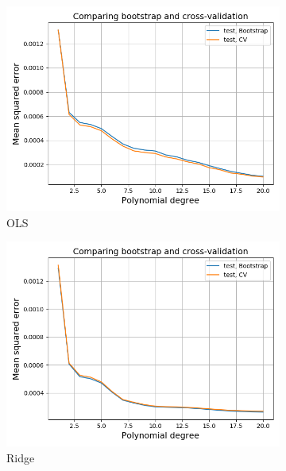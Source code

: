 \documentclass[a4paper]{article}
\begin{document}
\begin{figure}[H]
  \centering
  \begin{subfigure}{0.49\textwidth}
    \includegraphics[scale=0.45]{../figures/task_g/OLS/test_compare_BS_CV_p20_N22500_patch1_pmax20_nlamb1_OLS_Nbs264_k5_opt1.png}
    \caption{OLS}
  \end{subfigure}
  \begin{subfigure}{0.49\textwidth}
    \includegraphics[scale=0.45]{../figures/task_g/Ridge/test_compare_BS_CV_p20_N22500_patch1_pmax20_nlamb15_Ridge_Nbs264_k5_opt1.png}
    \caption{Ridge}
  \end{subfigure}\\
  \begin{subfigure}{0.49\textwidth}

\end{subfigure}
\end{figure}
\end{document}
